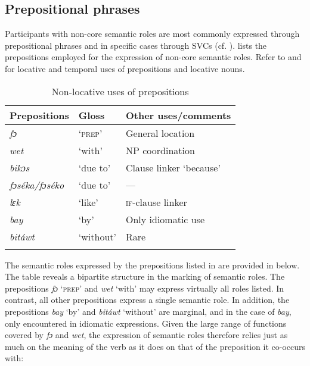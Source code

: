 \subsection{Prepositional phrases}\label{sec:9.1.3}

Participants with non-core semantic roles are most commonly expressed through prepositional phrases and in specific cases through SVCs (cf. ).  lists the prepositions employed for the expression of non-core semantic roles. Refer to  and  for locative and temporal uses of prepositions and locative nouns.

\begin{table}
\caption{Non-locative uses of prepositions}
\label{tab:key:9.1}

\begin{tabularx}{\textwidth}{XXX}
\lsptoprule

Prepositions & Gloss & Other uses/comments\\
\midrule
\itshape fɔ & ‘\textsc{prep}’ & General location\\
\itshape wet & ‘with’ & NP coordination\\
\itshape bikɔs & ‘due to’ & Clause linker ‘because’\\
\itshape fɔséka/fɔséko & ‘due to’ & —\\
\itshape lɛk & ‘like’ & \textsc{if-}clause linker \\
\itshape bay & ‘by’ & Only idiomatic use\\
\itshape bitáwt & ‘without’ & Rare\\
\lspbottomrule
\end{tabularx}
\end{table}
The semantic roles expressed by the prepositions listed in  are provided in  below. The table reveals a bipartite structure in the marking of semantic roles. The prepositions \textit{fɔ} ‘\textsc{prep}’ and \textit{wet} ‘with’ may express virtually all roles listed. In contrast, all other prepositions express a single semantic role. In addition, the prepositions \textit{bay} ‘by’ and \textit{bitáwt} ‘without’ are marginal, and in the case of \textit{bay}, only encountered in idiomatic expressions. Given the large range of functions covered by \textit{fɔ} and \textit{wet}, the expression of semantic roles therefore relies just as much on the meaning of the verb as it does on that of the preposition it co-occurs with: 

